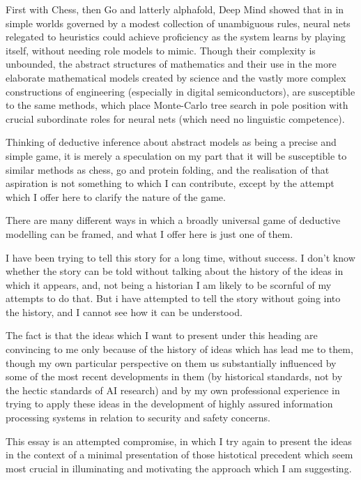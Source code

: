 \documentclass[10pt,titlepage]{book}
\begin{document}
First with Chess, then Go and latterly alphafold, Deep Mind showed that in in simple worlds governed by a modest collection of unambiguous rules, neural nets relegated to heuristics could achieve proficiency as the system learns by playing itself, without needing role models to mimic.
Though their complexity is unbounded, the abstract structures of mathematics and their use in the more elaborate mathematical models created by science and the vastly more complex constructions of engineering (especially in digital semiconductors), are susceptible to the same methods, which place Monte-Carlo tree search in pole position with crucial subordinate roles for neural nets (which need no linguistic competence).

Thinking of deductive inference about abstract models as being a precise and simple game, it is merely a speculation on my part that it will be susceptible to similar methods as chess, go and protein folding, and the realisation of that aspiration is not something to which I can contribute, except by the attempt which I offer here to clarify the nature of the game.

There are many different ways in which a broadly universal game of deductive modelling can be framed, and what I offer here is just one of them.

I have been trying to tell this story for a long time, without success.
I don't know whether the story can be told without talking about the history of the ideas in which it appears, and, not being a historian I am likely to be scornful of my attempts to do that.
But i have attempted to tell the story without going into the history, and I cannot see how it can be understood.

The fact is that the ideas which I want to present under this heading are convincing to me only because of the history of ideas which has lead me to them, though my own particular perspective on them us substantially influenced by some of the most recent developments in them (by historical standards, not by the hectic standards of AI research) and by my own professional experience in trying to apply these ideas in the development of highly assured information processing systems in relation to security and safety concerns.

This essay is an attempted compromise, in which I try again to present the ideas in the context of a minimal presentation of those histotical precedent which seem most crucial in illuminating and motivating the approach which I am suggesting.
\end{document}
